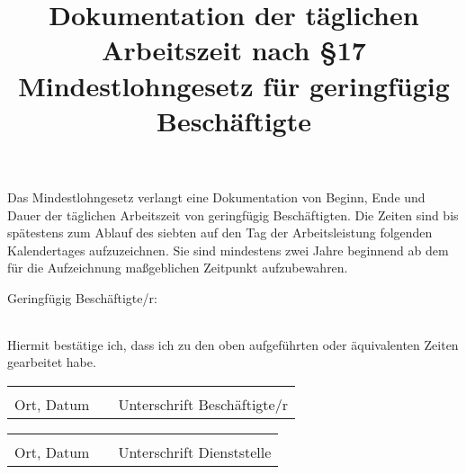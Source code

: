 \documentclass{article}
\begin{document}
\date{}
	\title{Dokumentation der täglichen Arbeitszeit nach §17
    Mindestlohngesetz für geringfügig Beschäftigte}
\maketitle
Das Mindestlohngesetz verlangt eine Dokumentation von Beginn, Ende und
Dauer der täglichen Arbeitszeit von geringfügig Beschäftigten. Die Zeiten sind bis
spätestens zum Ablauf des siebten auf den Tag der Arbeitsleistung folgenden
Kalendertages aufzuzeichnen. Sie sind mindestens zwei Jahre beginnend ab dem für
die Aufzeichnung maßgeblichen Zeitpunkt aufzubewahren.

  \vspace{0.5cm}
Geringfügig Beschäftigte/r: 
  \vspace{0.5cm}

  \begin{table}[h]
    \centering
    \begin{tabular}{l| c c c}
      
    \end{tabular}
  \end{table}

  \vspace{0.5cm}

  \noindent Hiermit bestätige ich, dass ich zu den oben aufgeführten oder äquivalenten Zeiten gearbeitet habe.

  \vspace{1.5cm}

  \begin{tabular}{lp{2em}l}
    \hspace{5cm}   && \hspace{7cm} \\\cline{1-1}\cline{3-3}
    Ort, Datum     && Unterschrift Beschäftigte/r
  \end{tabular}
 
  \vspace{1.5cm}

  \begin{tabular}{lp{2em}l}
    \hspace{5cm}   && \hspace{7cm} \\\cline{1-1}\cline{3-3}
    Ort, Datum     && Unterschrift Dienststelle
  \end{tabular}
  
\end{document}
